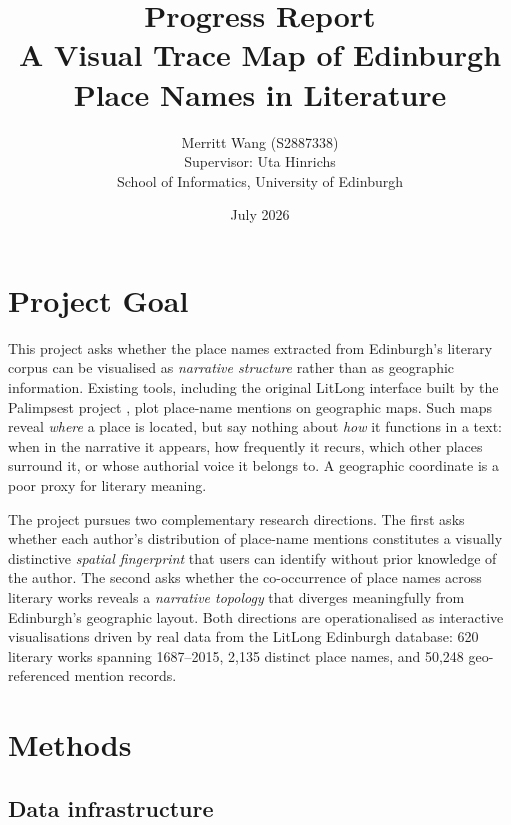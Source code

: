 \documentclass[11pt,a4paper]{article}
\title{\textbf{Progress Report}\\[0.4em]
\large A Visual Trace Map of Edinburgh Place Names in Literature}
\author{Merritt Wang (S2887338)\\
Supervisor: Uta Hinrichs\\
School of Informatics, University of Edinburgh}
\date{July 2026}
\begin{document}
\maketitle

\section{Project Goal}

This project asks whether the place names extracted from Edinburgh's literary corpus can be visualised as \emph{narrative structure} rather than as geographic information. Existing tools, including the original LitLong interface built by the Palimpsest project \cite{anderson2016}, plot place-name mentions on geographic maps. Such maps reveal \emph{where} a place is located, but say nothing about \emph{how} it functions in a text: when in the narrative it appears, how frequently it recurs, which other places surround it, or whose authorial voice it belongs to. A geographic coordinate is a poor proxy for literary meaning.

The project pursues two complementary research directions. The first asks whether each author's distribution of place-name mentions constitutes a visually distinctive \emph{spatial fingerprint} that users can identify without prior knowledge of the author. The second asks whether the co-occurrence of place names across literary works reveals a \emph{narrative topology} that diverges meaningfully from Edinburgh's geographic layout. Both directions are operationalised as interactive visualisations driven by real data from the LitLong Edinburgh database: 620 literary works spanning 1687--2015, 2,135 distinct place names, and 50,248 geo-referenced mention records.

\section{Methods}

\subsection*{Data infrastructure}
\end{document}

